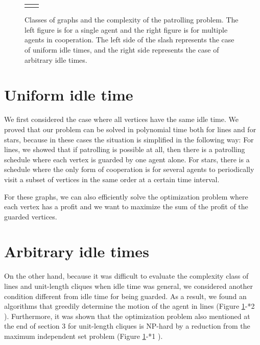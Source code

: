 \begin{figure}[htbp]
\begin{tabular}{cc}
\begin{minipage}{0.5\hsize}
    \end{minipage}
  \end{tabular}
  \caption{Classes of graphs and the complexity of the patrolling problem.
  The left figure is for a single agent and the right figure is for multiple agents in cooperation.
  The left side of the slash represents the case of uniform idle times, and the right side represents the case of arbitrary idle times.}
  \label{fig:shapeandcomplexity}
\end{figure}




\section{Uniform idle time}
We first considered the case where all vertices have the same idle time.  We proved that our problem can be solved in polynomial time both for lines and for stars, because in these cases the situation is simplified in the following way: 
For lines, we showed that if patrolling is possible at all, then there is a patrolling schedule where each vertex is guarded by one agent alone. 
For stars, there is a schedule where the only form of cooperation is for several agents to periodically visit a subset of vertices in the same order at a certain time interval.

For these graphs, we can also efficiently solve the optimization problem where each vertex has a profit and we want to maximize the sum of the profit of the guarded vertices. 

\section{Arbitrary idle times}

On the other hand, because it was difficult to evaluate the complexity class of lines and unit-length cliques when idle time was general, we considered
another condition different from idle time for being guarded.
As a result, we found an algorithms that greedily determine the motion of the agent in lines (Figure \ref{fig:shapeandcomplexity}-*2 ).
Furthermore, it was shown that
the optimization problem also mentioned at the end of section 3 for unit-length cliques is NP-hard by a reduction from the maximum independent set problem
(Figure \ref{fig:shapeandcomplexity}-*1 ).
